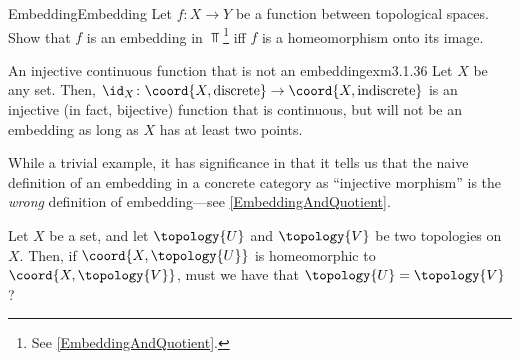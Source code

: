 \begin{exr}{Embedding}{Embedding}
Let $f\colon X\rightarrow Y$ be a function between topological spaces.  Show that $f$ is an embedding in $\Top$\footnote{See \cref{EmbeddingAndQuotient}.} iff $f$ is a homeomorphism onto its image.
\end{exr}
\begin{exm}{An injective continuous function that is not an embedding}{exm3.1.36}
Let $X$ be any set.  Then, $\id _X\colon \coord{X,\text{discrete}}\rightarrow \coord{X,\text{indiscrete}}$ is an injective (in fact, bijective) function that is continuous, but will not be an embedding as long as $X$ has at least two points.
\begin{rmk}
While a trivial example, it has significance in that it tells us that the naive definition of an embedding in a concrete category as ``injective morphism'' is the \emph{wrong} definition of embedding---see \cref{EmbeddingAndQuotient}.
\end{rmk}
\end{exm}
\begin{exr}{}{}
Let $X$ be a set, and let $\topology{U}$ and $\topology{V}$ be two topologies on $X$.  Then, if $\coord{X,\topology{U}}$ is homeomorphic to $\coord{X,\topology{V}}$, must we have that $\topology{U}=\topology{V}$?
\end{exr}

